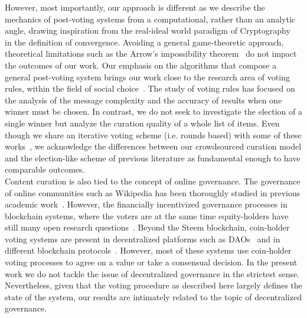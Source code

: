     However, most importantly, our approach is different as we describe the mechanics of post-voting systems from a computational, rather than an analytic angle, drawing inspiration from the real-ideal world paradigm of Cryptography~\cite{lindell} in the definition of convergence. Avoiding a general game-theoretic approach, theoretical limitations such as the Arrow's impossibility theorem~\cite{arrow1950difficulty} do not impact the outcomes of our work.
    Our emphasis on the algorithms that compose a general post-voting system brings our work close to the research area of voting rules, within the field of social choice~\cite{lu2011robust,conitzer2005communication,xia2010compilation}. The study of voting rules has focused on the analysis of the message complexity and the accuracy of results when one winner must be chosen. In contrast, we do not seek to investigate the election of a single winner but analyze the curation quality of a whole list of items. Even though we share an iterative voting scheme (i.e. rounds based) with some of these works~\cite{kalech2011practical}, we acknowledge the differences between our crowdsourced curation model and the election-like scheme of previous literature as fundamental enough to have comparable outcomes. \\

  Content curation is also tied to the concept of online governance. The governance of online communities such as Wikipedia has been thoroughly studied in previous academic work~\cite{leskovec2010governance,forte2008scaling}. However, the financially incentivized governance processes in blockchain systems, where the voters are at the same time equity-holders have still many open research questions~\cite{vitalik,ehrsam}.
   Beyond the Steem blockchain, coin-holder voting systems are present in decentralized platforms such as DAOs~\cite{darkdaos} and in different blockchain protocols~\cite{tezos}. However, most of these systems use coin-holder voting processes to agree on a value or take a consensual decision.
    In the present work we do not tackle the issue of decentralized governance in the strictest sense. Nevertheless, given that the voting procedure as described here largely defines the state of the system, our results are intimately related to the topic of decentralized governance.
    
  
  
